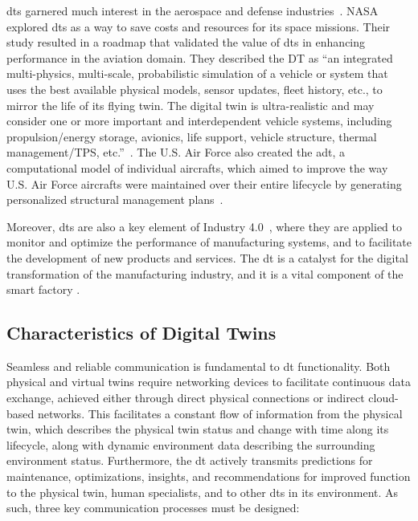 \acrshort{dt}s garnered much interest in the aerospace and defense industries~\parencite{negriReviewRolesDigital2017}. NASA explored \acrshort{dt}s as a way to save costs and resources for its space missions. Their study resulted in a roadmap that validated the value of \acrshort{dt}s in enhancing performance in the aviation domain. They described the DT as ``an integrated multi-physics, multi-scale, probabilistic simulation of a vehicle or system that uses the best available physical models, sensor updates, fleet history, etc., to mirror the life of its flying twin. The digital twin is ultra-realistic and may consider one or more important and interdependent vehicle systems, including propulsion/energy storage, avionics, life support, vehicle structure, thermal management/TPS, etc.''~\parencite{shaftoModelingSimulationInformation2010}. The U.S. Air Force also created the \acrfull{adt}, a computational model of individual aircrafts, which aimed to improve the way U.S. Air Force aircrafts were maintained over their entire lifecycle by generating personalized structural management plans~\parencite{tuegelAirframeDigitalTwin2012,gockelChallengesStructuralLife2012}.

Moreover, \acrshort{dt}s are also a key element of Industry 4.0~\parencite{brettelHowVirtualizationDecentralization2014,hermannDesignPrinciplesIndustrie2016,vachalekDigitalTwinIndustrial2017,negriReviewRolesDigital2017}, where they are applied to monitor and optimize the performance of manufacturing systems, and to facilitate the development of new products and services. The \acrshort{dt} is a catalyst for the digital transformation of the manufacturing industry, and it is a vital component of the smart factory \parencite{mabkhotRequirementsSmartFactory2018}.

\iffalse
    \subsection{Characteristics of Digital Twins}

    Seamless and reliable communication is fundamental to \acrshort{dt} functionality. Both physical and virtual twins require networking devices to facilitate continuous data exchange, achieved either through direct physical connections or indirect cloud-based networks. This facilitates a constant flow of information from the physical twin, which describes the physical twin status and change with time along its lifecycle, along with dynamic environment data describing the surrounding environment status. Furthermore, the \acrshort{dt} actively transmits predictions for maintenance, optimizations, insights, and recommendations for improved function to the physical twin, human specialists, and to other \acrshort{dt}s in its environment. As such, three key communication processes must be designed:

